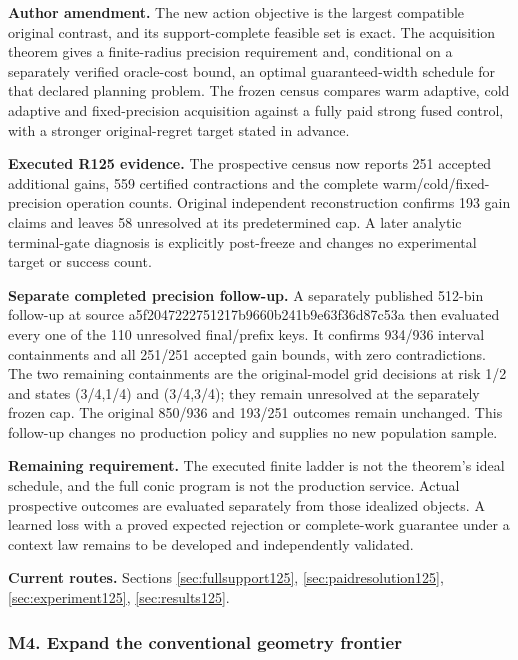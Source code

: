 \noindent\textbf{Author amendment.} The new action objective is the largest compatible original contrast, and its support-complete feasible set is exact. The acquisition theorem gives a finite-radius precision requirement and, conditional on a separately verified oracle-cost bound, an optimal guaranteed-width schedule for that declared planning problem. The frozen census compares warm adaptive, cold adaptive and fixed-precision acquisition against a fully paid strong fused control, with a stronger original-regret target stated in advance.

\noindent\textbf{Executed R125 evidence.} The prospective census now reports 251 accepted additional gains, 559 certified contractions and the complete warm/cold/fixed-precision operation counts. Original independent reconstruction confirms 193 gain claims and leaves 58 unresolved at its predetermined cap. A later analytic terminal-gate diagnosis is explicitly post-freeze and changes no experimental target or success count.

\noindent\textbf{Separate completed precision follow-up.} A separately published 512-bin follow-up at source a5f2047222751217b9660b241b9e63f36d87c53a then evaluated every one of the 110 unresolved final/prefix keys. It confirms 934/936 interval containments and all 251/251 accepted gain bounds, with zero contradictions. The two remaining containments are the original-model grid decisions at risk 1/2 and states (3/4,1/4) and (3/4,3/4); they remain unresolved at the separately frozen cap. The original 850/936 and 193/251 outcomes remain unchanged. This follow-up changes no production policy and supplies no new population sample.

\noindent\textbf{Remaining requirement.} The executed finite ladder is not the theorem's ideal schedule, and the full conic program is not the production service. Actual prospective outcomes are evaluated separately from those idealized objects. A learned loss with a proved expected rejection or complete-work guarantee under a context law remains to be developed and independently validated.

\noindent\textbf{Current routes.} Sections \ref{sec:fullsupport125}, \ref{sec:paidresolution125}, \ref{sec:experiment125}, \ref{sec:results125}.

\subsubsection{M4. Expand the conventional geometry frontier}

